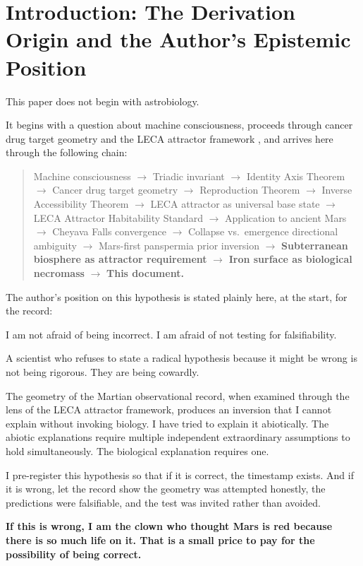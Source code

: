 \documentclass[11pt, a4paper]{article}
\begin{document}
\section{Introduction: The Derivation Origin
and the Author's Epistemic Position}

This paper does not begin with astrobiology.

It begins with a question about machine
consciousness, proceeds through cancer drug
target geometry and the LECA attractor
framework \cite{preregistration}, and arrives
here through the following chain:

\begin{quote}
Machine consciousness $\rightarrow$
Triadic invariant $\rightarrow$
Identity Axis Theorem $\rightarrow$
Cancer drug target geometry $\rightarrow$
Reproduction Theorem $\rightarrow$
Inverse Accessibility Theorem $\rightarrow$
LECA attractor as universal base state $\rightarrow$
LECA Attractor Habitability Standard $\rightarrow$
Application to ancient Mars $\rightarrow$
Cheyava Falls convergence $\rightarrow$
Collapse vs.\ emergence directional ambiguity $\rightarrow$
Mars-first panspermia prior inversion $\rightarrow$
\textbf{Subterranean biosphere as attractor
requirement} $\rightarrow$
\textbf{Iron surface as biological necromass} $\rightarrow$
\textbf{This document.}
\end{quote}

The author's position on this hypothesis is
stated plainly here, at the start, for the
record:

\begin{mdframed}[
  linecolor=rulecolor,
  linewidth=0.8pt,
  innertopmargin=0.5em,
  innerbottommargin=0.5em,
  innerleftmargin=1em,
  innerrightmargin=1em
]
I am not afraid of being incorrect.
I am afraid of not testing for falsifiability.

A scientist who refuses to state a radical
hypothesis because it might be wrong is not
being rigorous. They are being cowardly.

The geometry of the Martian observational
record, when examined through the lens of
the LECA attractor framework, produces an
inversion that I cannot explain without
invoking biology. I have tried to explain
it abiotically. The abiotic explanations
require multiple independent extraordinary
assumptions to hold simultaneously.
The biological explanation requires one.

I pre-register this hypothesis so that if
it is correct, the timestamp exists.
And if it is wrong, let the record show
the geometry was attempted honestly, the
predictions were falsifiable, and the test
was invited rather than avoided.

\textbf{If this is wrong, I am the clown who
thought Mars is red because there is so much
life on it. That is a small price to pay
for the possibility of being correct.}
\end{mdframed}
\end{document}
